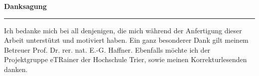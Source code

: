 
\begin{addmargin}[0cm]{0cm}
		\begin{center}
			\LARGE{\textbf{Danksagung}}\\
			\rule{\textwidth}{0.04cm}	
		\end{center}		
Ich bedanke mich bei all denjenigen, die mich während der Anfertigung dieser Arbeit unterstützt und motiviert haben. 
Ein ganz besonderer Dank gilt meinem Betreuer Prof. Dr. rer. nat. E.-G. Haffner. 
Ebenfalls möchte ich der Projektgruppe eTRainer der Hochschule Trier, sowie meinen Korrekturlesenden danken.
\end{addmargin}
\cleardoublepage